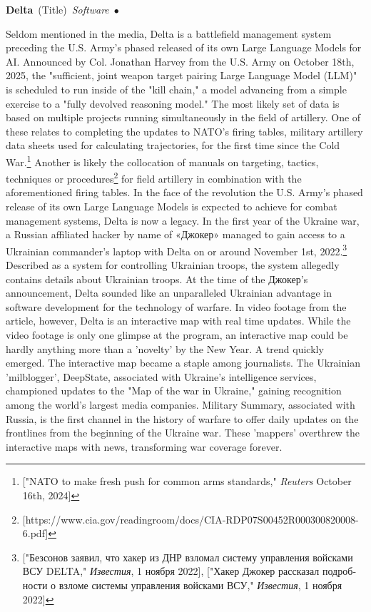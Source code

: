 \documentclass[10pt,a4paper,twoside]{article} %
\newcommand{\entry}[4]{\markboth{#1}{#1}\textbf{#1}\ {(#2)}\ \textit{#3}\ $\bullet$\ {#4}}  %
\begin{document}
\begin{multicols}{2}

\entry{Delta} {Title} {Software} {Seldom mentioned in the media, Delta is a battlefield management system preceding the U.S. Army's phased released of its own Large Language Models for AI. Announced by Col. Jonathan Harvey from the U.S. Army on October 18th, 2025, the "sufficient, joint weapon target pairing Large Language Model (LLM)" is scheduled to run inside of the "kill chain," a model advancing from a simple exercise to a "fully devolved reasoning model." The most likely set of data is based on multiple projects running simultaneously in the field of artillery. One of these relates to completing the updates to NATO's firing tables, military artillery data sheets used for calculating trajectories, for the first time since the Cold War.\footnote{["NATO to make fresh push for common arms standards," \emph{Reuters} October 16th, 2024]} Another is likely the collocation of manuals on targeting, tactics, techniques or procedures\footnote{[https://www.cia.gov/readingroom/docs/CIA-RDP07S00452R000300820008-6.pdf]} for field artillery in combination with the aforementioned firing tables. In the face of the revolution the U.S. Army's phased release of its own Large Language Models is expected to achieve for combat management systems, Delta is now a legacy. 
\indent In the first year of the Ukraine war, a Russian affiliated hacker by name of \textrussian{«Джокер»} managed to gain access to a Ukrainian commander's laptop with Delta on or around November 1st, 2022.\footnote{["\textrussian{Безсонов заявил, что хакер из ДНР взломал систему управления войсками ВСУ DELTA},"  \textukrainian{\emph{Известия}}, 1 ноября 2022], ["\textrussian{Хакер Джокер рассказал подробности о взломе системы управления войсками ВСУ},"  \textukrainian{\emph{Известия}}, 1 ноября 2022] } Described as a system for controlling Ukrainian troops, the system allegedly contains details about Ukrainian troops. At the time of the \textrussian{Джокер}'s announcement, Delta sounded like an unparalleled Ukrainian advantage in software development for the technology of warfare. In video footage from the article, however, Delta is an interactive map with real time updates. While the video footage is only one glimpse at the program, an interactive map could be hardly anything more than a 'novelty' by the New Year. A trend quickly emerged. The interactive map became a staple among journalists. The Ukrainian 'milblogger', DeepState, associated with Ukraine's intelligence services, championed updates to the "Map of the war in Ukraine," gaining recognition among the world's largest media companies. Military Summary, associated with Russia, is the first channel in the history of warfare to offer daily updates on the frontlines from the beginning of the Ukraine war. These 'mappers' overthrew the interactive maps with news, transforming war coverage forever. 

}
\end{multicols}
\end{document}
